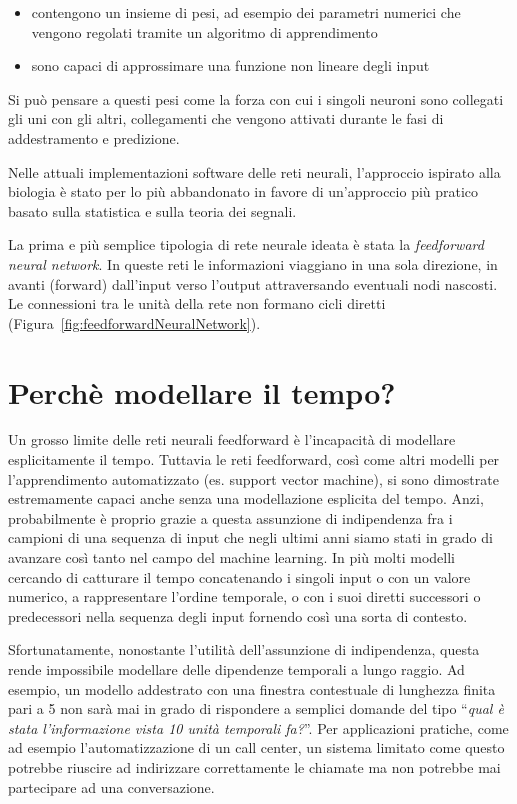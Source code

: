 \begin{itemize}
  \item contengono un insieme di pesi, ad esempio dei parametri numerici che vengono regolati tramite un algoritmo di apprendimento
  \item sono capaci di approssimare una funzione non lineare degli input
\end{itemize}

Si pu\`o pensare a questi pesi come la forza con cui i singoli neuroni sono collegati gli uni con gli altri, collegamenti che vengono attivati durante le fasi di addestramento e predizione.

Nelle attuali implementazioni software delle reti neurali, l'approccio ispirato alla biologia \`e stato per lo pi\`u abbandonato in favore di un'approccio pi\`u pratico basato sulla statistica e sulla teoria dei segnali.

La prima e pi\`u semplice tipologia di rete neurale ideata \`e stata la \emph{feedforward neural network}.
In queste reti le informazioni viaggiano in una sola direzione, in avanti (forward) dall'input verso l'output attraversando eventuali nodi nascosti.
Le connessioni tra le unit\`a della rete non formano cicli diretti (Figura~\ref{fig:feedforwardNeuralNetwork}).

\section{Perch\`e modellare il tempo?}
Un grosso limite delle reti neurali feedforward \`e l'incapacit\`a di modellare esplicitamente il tempo.
Tuttavia le reti feedforward, cos\`i come altri modelli per l'apprendimento automatizzato (es. support vector machine), si sono dimostrate estremamente capaci anche senza una modellazione esplicita del tempo.
Anzi, probabilmente \`e proprio grazie a questa assunzione di indipendenza fra i campioni di una sequenza di input che negli ultimi anni siamo stati in grado di avanzare cos\`i tanto nel campo del machine learning.
In pi\`u molti modelli cercando di catturare il tempo concatenando i singoli input o con un valore numerico, a rappresentare l'ordine temporale, o con i suoi diretti successori o predecessori nella sequenza degli input fornendo cos\`i una sorta di contesto.

Sfortunatamente, nonostante l'utilit\`a dell'assunzione di indipendenza, questa rende impossibile modellare delle dipendenze temporali a lungo raggio.
Ad esempio, un modello addestrato con una finestra contestuale di lunghezza finita pari a 5 non sar\`a mai in grado di rispondere a semplici domande del tipo ``\emph{qual \`e stata l'informazione vista 10 unit\`a temporali fa?}''.
Per applicazioni pratiche, come ad esempio l'automatizzazione di un call center, un sistema limitato come questo potrebbe riuscire ad indirizzare correttamente le chiamate ma non potrebbe mai partecipare ad una conversazione.

